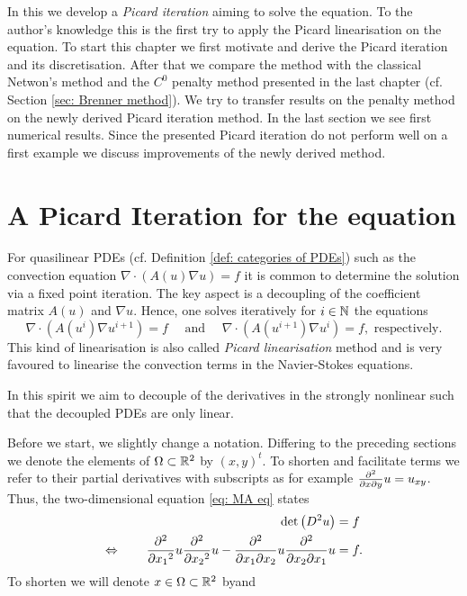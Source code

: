 In this we develop a \emph{Picard iteration} aiming to solve the \MA equation. To the author's knowledge this is the first try to apply the Picard linearisation on the \MA equation. 
To start this chapter we first motivate and derive the Picard iteration and its discretisation.
After that we compare the method with the classical Netwon's method and the $C^0$ penalty method presented in the last chapter (cf. Section \ref{sec: Brenner method}). We try to transfer results on the penalty method on the newly derived Picard iteration method. 
In the last section we see first numerical results. Since the presented Picard iteration do not perform well on a first example we discuss improvements of the newly derived method.


\section{A Picard Iteration for the \MA equation} \label{sec: motivation picard iteration}
For quasilinear PDEs (cf. Definition \ref{def: categories of PDEs}) such as the convection equation $\nabla \cdot (A(u) \nabla u ) = f$ it is common to determine the solution via a fixed point iteration. The key aspect is a decoupling of the coefficient matrix $A(u)$ and $\nabla u$. Hence, one solves iteratively  for $i\in \mathbb{N}$ the equations
\[
	\nabla \cdot (A(u^{i} )\nabla u^{i+1}) = f   \quad \text{      and      }\quad \nabla \cdot (A(u^{i+1}) \nabla u^{i}) = f, \text{ respectively}.
\] 
This kind of linearisation is also called \emph{Picard linearisation} method and is very favoured to linearise the convection terms in the Navier-Stokes equations.

In this spirit we aim to decouple of the derivatives in the strongly nonlinear \MA such that the decoupled PDEs are only linear. 

Before we start, we slightly change a notation. Differing to the preceding sections we denote the elements of $\Omega \subset \mathbb{R}^2$ by  $(x,y)^t$. To shorten and facilitate terms we refer to their partial derivatives with subscripts as for example $\frac {\partial^2} {\partial x\partial y} u = u_{xy}$.
Thus, the two-dimensional \MA equation \eqref{eq: MA eq} states
\begin{align}
 \det{\left(D^2 u\right)} &= f \nonumber \\
 	\Leftrightarrow \qquad  \frac {\partial^2} {\partial {x_1}^2} u \frac {\partial^2} {\partial {x_2}^2} u -\frac {\partial^2} {\partial x_1\partial x_2} u \frac {\partial^2} {\partial x_2\partial x_1} u  &= f. \label{eq:mongeAmpere detForm}
\end{align}
To shorten we will denote $x \in \Omega \subset {\mathbb{R}^2} $ byand 


